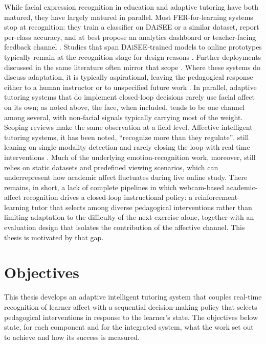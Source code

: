 While facial expression recognition in education and adaptive tutoring have both matured, they have largely matured in parallel. Most \ac{FER}-for-learning systems stop at recognition: they train a classifier on \ac{DAiSEE} or a similar dataset, report per-class accuracy, and at best propose an analytics dashboard or teacher-facing feedback channel \cite{leong_deep_2020,rao_recognition_2021,mehta_three-dimensional_2022}. Studies that span \ac{DAiSEE}-trained models to online prototypes typically remain at the recognition stage for design reasons \cite{komaravalli_detecting_2023,liu_dynamic_2026,aly_revolutionizing_2025}. Further deployments discussed in the same literature often mirror that scope \cite{aly_enhancing_2023}. Where these systems do discuss adaptation, it is typically aspirational, leaving the pedagogical response either to a human instructor or to unspecified future work \cite{asaju_adaptive_2022,aly_comprehensive_2025,Prabakaran2025FacialExpressionAdaptiveTeaching}. In parallel, adaptive tutoring systems that do implement closed-loop decisions rarely use facial affect on its own; as noted above, the face, when included, tends to be one channel among several, with non-facial signals typically carrying most of the weight. Scoping reviews make the same observation at a field level. Affective intelligent tutoring systems, it has been noted, ``recognize more than they regulate'', still leaning on single-modality detection and rarely closing the loop with real-time interventions \cite{yuvaraj_affective_2025}. Much of the underlying emotion-recognition work, moreover, still relies on static datasets and predefined viewing scenarios, which can underrepresent how academic affect fluctuates during live online study. There remains, in short, a lack of complete pipelines in which webcam-based academic-affect recognition drives a closed-loop instructional policy: a reinforcement-learning tutor that selects among diverse pedagogical interventions rather than limiting adaptation to the difficulty of the next exercise alone, together with an evaluation design that isolates the contribution of the affective channel. This thesis is motivated by that gap.
\section{Objectives}\label{sec:objectives}

This thesis develops an adaptive intelligent tutoring system that couples real-time recognition of learner affect with a sequential decision-making policy that selects pedagogical interventions in response to the learner's state. The objectives below state, for each component and for the integrated system, what the work set out to achieve and how its success is measured.

